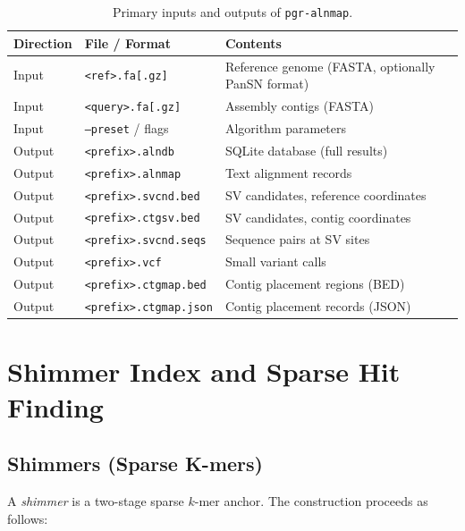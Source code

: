 \documentclass[11pt,a4paper]{article}
\begin{document}
\begin{table}[h]
\centering
\caption{Primary inputs and outputs of \texttt{pgr-alnmap}.}
\begin{tabular}{lll}
\toprule
\textbf{Direction} & \textbf{File / Format} & \textbf{Contents} \\
\midrule
Input  & \texttt{<ref>.fa[.gz]}    & Reference genome (FASTA, optionally PanSN format) \\
Input  & \texttt{<query>.fa[.gz]}  & Assembly contigs (FASTA) \\
Input  & \texttt{--preset} / flags & Algorithm parameters \\
\midrule
Output & \texttt{<prefix>.alndb}      & SQLite database (full results) \\
Output & \texttt{<prefix>.alnmap}     & Text alignment records \\
Output & \texttt{<prefix>.svcnd.bed}  & SV candidates, reference coordinates \\
Output & \texttt{<prefix>.ctgsv.bed}  & SV candidates, contig coordinates \\
Output & \texttt{<prefix>.svcnd.seqs} & Sequence pairs at SV sites \\
Output & \texttt{<prefix>.vcf}        & Small variant calls \\
Output & \texttt{<prefix>.ctgmap.bed} & Contig placement regions (BED) \\
Output & \texttt{<prefix>.ctgmap.json}& Contig placement records (JSON) \\
\bottomrule
\end{tabular}
\end{table}

\section{Shimmer Index and Sparse Hit Finding}
\label{sec:shimmer}

\subsection{Shimmers (Sparse K-mers)}

A \emph{shimmer} is a two-stage sparse $k$-mer anchor.
The construction proceeds as follows:
\end{document}
